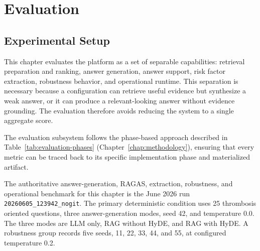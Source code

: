 \chapter{Evaluation}
\label{chap:evaluation}

\section{Experimental Setup}

This chapter evaluates the platform as a set of separable capabilities: retrieval preparation and ranking, answer generation, answer support, risk factor extraction, robustness behavior, and operational runtime. This separation is necessary because a configuration can retrieve useful evidence but synthesize a weak answer, or it can produce a relevant-looking answer without evidence grounding. The evaluation therefore avoids reducing the system to a single aggregate score.

The evaluation subsystem follows the phase-based approach described in Table~\ref{tab:evaluation-phases} (Chapter~\ref{chap:methodology}), ensuring that every metric can be traced back to its specific implementation phase and materialized artifact.

The authoritative answer-generation, RAGAS, extraction, robustness, and operational benchmark for this chapter is the June 2026 run \texttt{20260605\_123942\_nogit}. The primary deterministic condition uses 25 thrombosis oriented questions, three answer-generation modes, seed 42, and temperature 0.0. The three modes are LLM only, RAG without HyDE, and RAG with HyDE. A robustness group records five seeds, 11, 22, 33, 44, and 55, at configured temperature 0.2.


